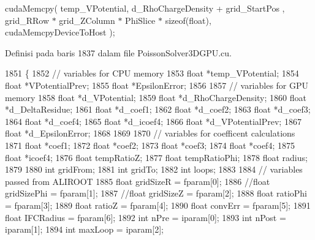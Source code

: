 cuda\+Memcpy( temp\+\_\+\+V\+Potential, d\+\_\+\+Rho\+Charge\+Density + grid\+\_\+\+Start\+Pos , grid\+\_\+\+R\+Row $\ast$ grid\+\_\+\+Z\+Column $\ast$ Phi\+Slice $\ast$ sizeof(float), cuda\+Memcpy\+Device\+To\+Host ); 

Definisi pada baris 1837 dalam file Poisson\+Solver3\+D\+G\+P\+U.\+cu.


\begin{DoxyCode}
1851 \{
1852     \textcolor{comment}{// variables for CPU memory}
1853     \textcolor{keywordtype}{float} *temp\_VPotential;
1854     \textcolor{keywordtype}{float} *VPotentialPrev;
1855     \textcolor{keywordtype}{float} *EpsilonError;        
1856 
1857     \textcolor{comment}{// variables for GPU memory }
1858     \textcolor{keywordtype}{float} *d\_VPotential;
1859     \textcolor{keywordtype}{float} *d\_RhoChargeDensity;
1860     \textcolor{keywordtype}{float} *d\_DeltaResidue;
1861     \textcolor{keywordtype}{float} *d\_coef1;
1862     \textcolor{keywordtype}{float} *d\_coef2;
1863     \textcolor{keywordtype}{float} *d\_coef3;
1864     \textcolor{keywordtype}{float} *d\_coef4;
1865     \textcolor{keywordtype}{float} *d\_icoef4;
1866     \textcolor{keywordtype}{float} *d\_VPotentialPrev;
1867     \textcolor{keywordtype}{float} *d\_EpsilonError;
1868     
1869 
1870     \textcolor{comment}{// variables for coefficent calculations}
1871     \textcolor{keywordtype}{float} *coef1;
1872     \textcolor{keywordtype}{float} *coef2;
1873     \textcolor{keywordtype}{float} *coef3;
1874     \textcolor{keywordtype}{float} *coef4;
1875     \textcolor{keywordtype}{float} *icoef4;
1876     \textcolor{keywordtype}{float} tempRatioZ;
1877     \textcolor{keywordtype}{float} tempRatioPhi;
1878     \textcolor{keywordtype}{float} radius;
1879 
1880     \textcolor{keywordtype}{int} gridFrom;
1881     \textcolor{keywordtype}{int} gridTo; 
1882     \textcolor{keywordtype}{int} loops;
1883 
1884     \textcolor{comment}{// variables passed from ALIROOT}
1885     \textcolor{keywordtype}{float} gridSizeR     = fparam[0];
1886     \textcolor{comment}{//float gridSizePhi = fparam[1];}
1887     \textcolor{comment}{//float gridSizeZ       = fparam[2];}
1888     \textcolor{keywordtype}{float} ratioPhi      = fparam[3];
1889     \textcolor{keywordtype}{float} ratioZ        = fparam[4];
1890     \textcolor{keywordtype}{float} convErr       = fparam[5];
1891     \textcolor{keywordtype}{float} IFCRadius     = fparam[6];
1892     \textcolor{keywordtype}{int} nPre    = iparam[0];
1893     \textcolor{keywordtype}{int} nPost   = iparam[1];
1894     \textcolor{keywordtype}{int} maxLoop = iparam[2];

\end{DoxyCode}
